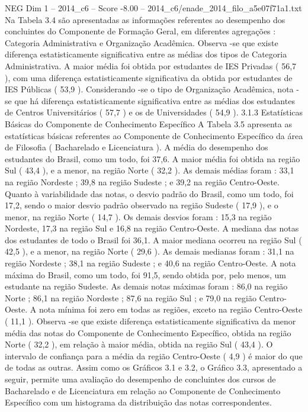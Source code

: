 \begin{textsample}{NEG Dim 1 – 2014\_c6 – Score -8.00 – 2014\_c6/enade\_2014\_filo\_a5e07f71a1.txt}
Na Tabela 3.4 são apresentadas as informações referentes ao desempenho dos concluintes do Componente de Formação Geral, em diferentes agregações : Categoria Administrativa e Organização Acadêmica.
Observa -se que existe diferença estatisticamente significativa entre as médias dos tipos de Categoria Administrativa.
A maior média foi obtida por estudantes de IES Privadas ( 56,7 ), com uma diferença estatisticamente significativa da obtida por estudantes de IES Públicas ( 53,9 ).
Considerando -se o tipo de Organização Acadêmica, nota -se que há diferença estatisticamente significativa entre as médias dos estudantes de Centros Universitários ( 57,7 ) e os de Universidades ( 54,9 ). 3.1.3 Estatísticas Básicas do Componente de Conhecimento Específico A Tabela 3.5 apresenta as estatísticas básicas referentes ao Componente de Conhecimento Específico da área de Filosofia ( Bacharelado e Licenciatura ).
A média do desempenho dos estudantes do Brasil, como um todo, foi 37,6.
A maior média foi obtida na região Sul ( 43,4 ), e a menor, na região Norte ( 32,2 ).
As demais médias foram : 33,1 na região Nordeste ; 39,8 na região Sudeste ; e 39,2 na região Centro-Oeste.
Quanto à variabilidade das notas, o desvio padrão do Brasil, como um todo, foi 17,2, sendo o maior desvio padrão observado na região Sudeste ( 17,9 ), e o menor, na região Norte ( 14,7 ).
Os demais desvios foram : 15,3 na região Nordeste, 17,3 na região Sul e 16,8 na região Centro-Oeste.
A mediana das notas dos estudantes de todo o Brasil foi 36,1.
A maior mediana ocorreu na região Sul ( 42,5 ), e a menor, na região Norte ( 29,6 ).
As demais medianas foram : 31,1 na região Nordeste ; 38,1 na região Sudeste ; e 40,6 na região Centro-Oeste.
A nota máxima do Brasil, como um todo, foi 91,5, sendo obtida por, pelo menos, um estudante na região Sudeste.
As demais notas máximas foram : 86,0 na região Norte ; 86,1 na região Nordeste ; 87,6 na região Sul ; e 79,0 na região Centro-Oeste.
A nota mínima foi zero em todas as regiões, exceto na região Centro-Oeste ( 11,1 ).
Observa -se que existe diferença estatisticamente significativa da menor média das notas do Componente de Conhecimento Específico, obtida na região Norte ( 32,2 ), em relação à maior média, obtida na região Sul ( 43,4 ).
O intervalo de confiança para a média da região Centro-Oeste ( 4,9 ) é maior do que de todas as outras.
Assim como os Gráficos 3.1 e 3.2, o Gráfico 3.3, apresentado a seguir, permite uma avaliação do desempenho de concluintes dos cursos de Bacharelado e de Licenciatura em relação ao Componente de Conhecimento Específico com um histograma da distribuição das notas correspondentes.

\end{textsample}
